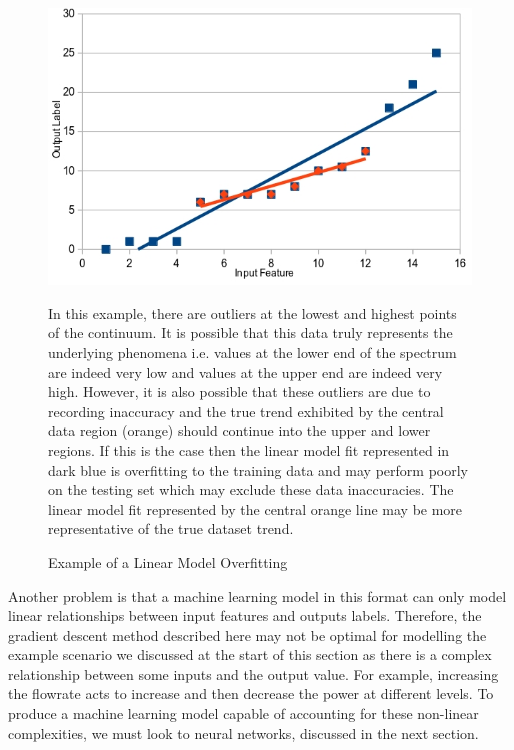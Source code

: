 \begin{figure}[h]
	\centering
	\includegraphics[scale=0.45]{Figures/overfitting.jpg}
	\caption{Example of a Linear Model Overfitting} {In this example, there are outliers at the lowest and highest points of the continuum.  It is possible that this data truly represents the underlying phenomena i.e. values at the lower end of the spectrum are indeed very low and values at the upper end are indeed very high. However, it is also possible that these outliers are due to recording inaccuracy and the true trend exhibited by the central data region (orange) should continue into the upper and lower regions. If this is the case then the linear model fit represented in dark blue is overfitting to the training data and may perform poorly on the testing set which may exclude these data inaccuracies. The linear model fit represented by the central orange line may be more representative of the true dataset trend.}
	\label{fig:overfitting}
\end{figure}
		
\noindent
Another problem is that a machine learning model in this format can only model linear relationships between input features and outputs labels. Therefore, the gradient descent method described here may not be optimal for modelling the example scenario we discussed at the start of this section as there is a complex relationship between some inputs and the output value. For example, increasing the flowrate acts to increase and then decrease the power at different levels. To produce a machine learning model capable of accounting for these non-linear complexities, we must look to neural networks, discussed in the next section. \\		

